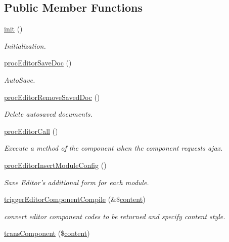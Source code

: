 \subsection*{Public Member Functions}
\begin{DoxyCompactItemize}
\item 
\hyperlink{classeditorController_a40838d463bafa5863b5f966b8828738b}{init} ()
\begin{DoxyCompactList}\small\item\em Initialization. \end{DoxyCompactList}\item 
\hyperlink{classeditorController_a671035df077f460bc8c60dcea0410344}{proc\-Editor\-Save\-Doc} ()
\begin{DoxyCompactList}\small\item\em Auto\-Save. \end{DoxyCompactList}\item 
\hyperlink{classeditorController_a869072fefa3ae722ecc0e0123b5f8bbd}{proc\-Editor\-Remove\-Saved\-Doc} ()
\begin{DoxyCompactList}\small\item\em Delete autosaved documents. \end{DoxyCompactList}\item 
\hyperlink{classeditorController_ab7eab43a1ba21645dabcf36f32b27289}{proc\-Editor\-Call} ()
\begin{DoxyCompactList}\small\item\em Execute a method of the component when the component requests ajax. \end{DoxyCompactList}\item 
\hyperlink{classeditorController_af20e397838bd94b60b09b0cba2d7da0d}{proc\-Editor\-Insert\-Module\-Config} ()
\begin{DoxyCompactList}\small\item\em Save Editor's additional form for each module. \end{DoxyCompactList}\item 
\hyperlink{classeditorController_a6003487c398eae0676e15f5437cebdf8}{trigger\-Editor\-Component\-Compile} (\&\$\hyperlink{classcontent}{content})
\begin{DoxyCompactList}\small\item\em convert editor component codes to be returned and specify content style. \end{DoxyCompactList}\item 
\hyperlink{classeditorController_a9ef6499da56cf876c70813624ae4a2c0}{trans\-Component} (\$\hyperlink{classcontent}{content})

\end{DoxyCompactItemize}
